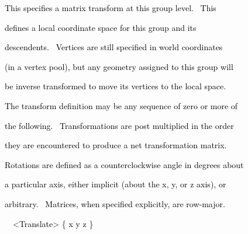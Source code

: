 \documentclass[a4paper]{article}
\newcommand\textstyleOOoComputerKeyWord[1]{\textrm{\textcolor[rgb]{0.0,0.0,0.5019608}{#1}}}
\newcommand\textstyleOOoAssemblerSpecialChar[1]{\textrm{\textcolor[rgb]{0.0,0.5019608,0.0}{#1}}}
\newcommand\textstyleOOoAssemblerIdent[1]{\textrm{\textcolor{black}{#1}}}
\begin{document}
\bigskip

{\color{black}
\textstyleOOoComputerKeyWord{\textcolor{black}{\ \ \ \ This specifies a matrix transform at this group level. \ This}}}

{\color{black}
\textstyleOOoComputerKeyWord{\textcolor{black}{\ \ \ \ defines a local coordinate space for this group and its}}}

\clearpage
\bigskip

{\color{black}
\textstyleOOoComputerKeyWord{\textcolor{black}{\ \ \ \ descendents. \ Vertices are still specified in world
coordinates}}}

{\color{black}
\textstyleOOoComputerKeyWord{\textcolor{black}{\ \ \ \ (in a vertex pool), but any geometry assigned to this group
will}}}

{\color{black}
\textstyleOOoComputerKeyWord{\textcolor{black}{\ \ \ \ be inverse transformed to move its vertices to the local
space.}}}


\bigskip

{\color{black}
\textstyleOOoComputerKeyWord{\textcolor{black}{\ \ \ \ The transform definition may be any sequence of zero or more
of}}}

{\color{black}
\textstyleOOoComputerKeyWord{\textcolor{black}{\ \ \ \ the following. \ Transformations are post multiplied in the
order}}}

{\color{black}
\textstyleOOoComputerKeyWord{\textcolor{black}{\ \ \ \ they are encountered to produce a net transformation matrix.}}}

{\color{black}
\textstyleOOoComputerKeyWord{\textcolor{black}{\ \ \ \ Rotations are defined as a counterclockwise angle in degrees
about}}}

{\color{black}
\textstyleOOoComputerKeyWord{\textcolor{black}{\ \ \ \ a particular axis, either implicit (about the x, y, or z axis),
or}}}

{\color{black}
\textstyleOOoComputerKeyWord{\textcolor{black}{\ \ \ \ arbitrary. \ Matrices, when specified explicitly, are
row-major.}}}


\bigskip

{\color{black}
\textstyleOOoComputerKeyWord{\textcolor{black}{\ \ \ \ \ \ }}\textstyleOOoAssemblerSpecialChar{{\textless}}\textstyleOOoAssemblerIdent{Translate}\textstyleOOoAssemblerSpecialChar{{\textgreater}}\textstyleOOoComputerKeyWord{\textcolor{black}{
}}\textstyleOOoAssemblerSpecialChar{\{}\textstyleOOoComputerKeyWord{\textcolor{black}{
}}\textstyleOOoAssemblerIdent{x}\textstyleOOoComputerKeyWord{\textcolor{black}{
}}\textstyleOOoAssemblerIdent{y}\textstyleOOoComputerKeyWord{\textcolor{black}{
}}\textstyleOOoAssemblerIdent{z}\textstyleOOoComputerKeyWord{\textcolor{black}{
}}\textstyleOOoAssemblerSpecialChar{\}}}
\end{document}
